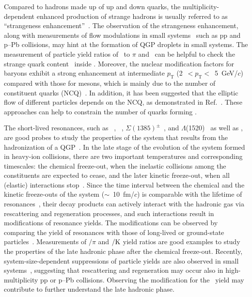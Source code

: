Compared to hadrons made up of up and down quarks, the multiplicity-dependent enhanced production of strange hadrons is usually referred to as ``strangeness enhancement''~\cite{ALICE:2016fzo}. The observation of the strangeness enhancement, along with measurements of flow modulations in small systems~\cite{PHENIX:2018lia, ALICE:2021nir} such as pp and p--Pb collisions, may hint at the formation of QGP droplets in small systems. The measurement of particle yield ratios of \fzero~to $\pi$ and \kstar~can be helpful to check the strange quark content~\cite{LHCb:2014ooi, LHCb:2014vbo} inside \fzero. Moreover, the nuclear modification factors for baryons exhibit a strong enhancement at intermediate $p_{\mathrm{T}}$ (2~$<p_{\mathrm{T}}<$~5~GeV/$c$) compared with those for mesons, which is mainly due to the number of constituent quarks (NCQ)~\cite{Cronin:1974zm, Fries:2003vb, ALICE:2022wpn}. In addition, it has been suggested that the elliptic flow of different particles depends on the NCQ, as demonstrated in Ref.~\cite{Wang:2022det}. These approaches can help to constrain the number of quarks forming \fzero.

The short-lived resonances, such as \rhoz~\cite{ALICE:2018qdv}, \kstar~\cite{ALICE:2019etb, ALICE:2016sak}, $\Sigma(1385)^{\pm}$~\cite{ALICE:2022zuc}, and $\Lambda$(1520)~\cite{ALICE:2018ewo} as well as \fzero, are good probes to study the properties of the system that results from the hadronization of a QGP~\cite{Bierlich:2021poz, Knospe:2015nva}. In the late stage of the evolution of the system formed in heavy-ion collisions, there are two important temperatures and corresponding timescales: the chemical freeze-out, when the inelastic collisions among the constituents are expected to cease, and the later kinetic freeze-out, when all (elastic) interactions stop~\cite{Song:1996ik}. Since the time interval between the chemical and the kinetic freeze-outs of the system ($\sim$~10~fm/$c$) is comparable with the lifetime of resonances~\cite{ALICE:2011dyt, ALICE:2019xyr}, their decay products can actively interact with the hadronic gas via rescattering and regeneration processes, and such interactions result in modifications of resonance yields. The modifications can be observed by comparing the yield of resonances with those of long-lived or ground-state particles~\cite{ALICE:2018pal}. Measurements of \rhoz$/\pi$ and \kstar$\rm{}/K$ yield ratios are good examples to study the properties of the late hadronic phase after the chemical freeze-out. Recently, system-size-dependent suppressions of particle yields are also observed in small systems~\cite{ALICE:2016sak, ALICE:2019etb}, suggesting that rescattering and regeneration may occur also in high-multiplicity pp or p--Pb collisions. Observing the modification for the \fzero~yield may contribute to further understand the late hadronic phase.

